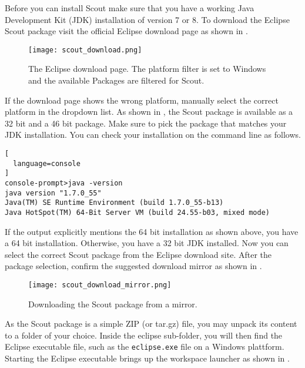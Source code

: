 %

Before you can install Scout make sure that you have a working Java Development Kit (JDK) installation of version 7 or 8.
To download the Eclipse Scout package visit the official Eclipse download page as shown in .

\begin{figure}
\texttt{[image: scout\_download.png]}
\caption{The Eclipse download page. The platform filter is set to Windows and the available Packages are filtered for Scout.}
\end{figure}

If the download page shows the wrong platform, manually select the correct platform in the dropdown list.
As shown in , the Scout package is available as a 32 bit and a 46 bit package. 
Make sure to pick the package that matches your JDK installation. 
You can check your installation on the command line as follows.

\begin{lstlisting}[
  language=console
]
console-prompt>java -version
java version "1.7.0_55"
Java(TM) SE Runtime Environment (build 1.7.0_55-b13)
Java HotSpot(TM) 64-Bit Server VM (build 24.55-b03, mixed mode)
\end{lstlisting}

If the output explicitly mentions the 64 bit installation as shown above, you have a 64 bit installation. 
Otherwise, you have a 32 bit JDK installed.
Now you can select the correct Scout package from the Eclipse download site. 
After the package selection, confirm the suggested download mirror as shown in .

\begin{figure}
\texttt{[image: scout\_download\_mirror.png]}
\caption{Downloading the Scout package from a mirror.}
\end{figure}

As the Scout package is a simple ZIP (or tar.gz) file, you may unpack its content to a folder of your choice.
Inside the eclipse sub-folder, you will then find the Eclipse executable file, such as the \texttt{eclipse.exe} file on a Windows plattform. 
Starting the Eclipse executable brings up the workspace launcher as shown in .


